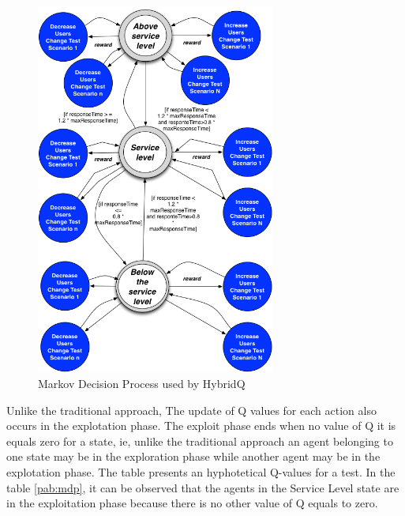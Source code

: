 \begin{figure}[h!]
\center
\includegraphics[width=0.7\textwidth]{./images/mdp3.png}
\caption{Markov Decision Process used by HybridQ}
\label{fig:mdphybridq}
\end{figure}


Unlike the traditional approach, The update of Q values for each action also occurs in the explotation phase. The exploit phase ends when no value of Q it is equals zero for a state, ie, unlike the traditional approach an agent belonging to one state may be in the exploration phase while another agent may be in the explotation phase. The table presents an hyphotetical Q-values for a test. In the table \ref{pab:mdp}, it can be observed that the agents in the Service Level state are in the exploitation phase because there is no other value of Q equals to zero.


